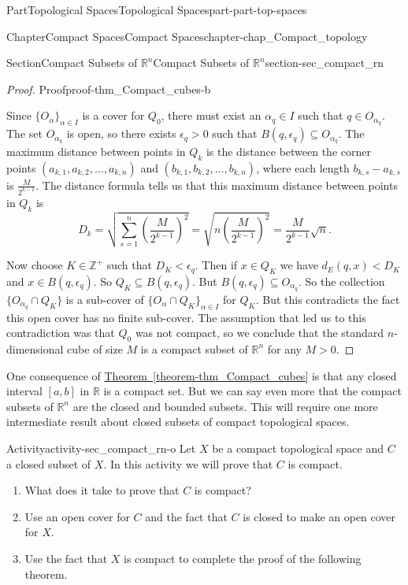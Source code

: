 \documentclass[oneside,10pt,]{book}
\newcommand{\xreffont}{\relax}
\numberwithin{equation}{chapter}
\newcommand{\Z}{\mathbb{Z}}
\newcommand{\R}{\mathbb{R}}
\newcommand{\lt}{<}
\newcommand{\gt}{>}
\begin{document}
\begin{partptx}{Part}{Topological Spaces}{}{Topological Spaces}{}{}{part-part-top-spaces}
\begin{chapterptx}{Chapter}{Compact Spaces}{}{Compact Spaces}{}{}{chapter-chap_Compact_topology}
\begin{sectionptx}{Section}{Compact Subsets of \(\R^n\)}{}{Compact Subsets of \(\R^n\)}{}{}{section-sec_compact_rn}
\begin{proof}{Proof}{}{proof-thm_Compact_cubes-b}
\par
Since \(\{O_{\alpha}\}_{\alpha \in I}\) is a cover for \(Q_0\), there must exist an \(\alpha_q \in I\) such that \(q \in O_{\alpha_q}\). The set \(O_{\alpha_q}\) is open, so there exists \(\epsilon_q \gt 0\) such that \(B(q, \epsilon_q) \subseteq O_{\alpha_q}\). The maximum distance between points in \(Q_k\) is the distance between the corner points \((a_{k,1}, a_{k,2}, \ldots,
a_{k,n})\) and \((b_{k,1}, b_{k,2}, \ldots, b_{k,n})\), where each length \(b_{k,s} - a_{k,s}\) is \(\frac{M}{2^{k-1}}\). The distance formula tells us that this maximum distance between points in \(Q_k\) is%
\begin{equation*}
D_k = \sqrt{ \sum_{s=1}^n \left(\frac{M}{2^{k-1}}\right)^2} =  \sqrt{ n \left(\frac{M}{2^{k-1}}\right)^2} = \frac{M}{2^{k-1}} \sqrt{n}\text{.}
\end{equation*}
%
\par
Now choose \(K \in \Z^+\) such that \(D_K \lt \epsilon_q\). Then if \(x \in Q_K\) we have \(d_E(q,x)\lt D_K\) and \(x \in B(q, \epsilon_q)\). So \(Q_K \subseteq B(q, \epsilon_q)\). But \(B(q, \epsilon_q) \subseteq O_{\alpha_q}\). So the collection \(\{O_{\alpha_q} \cap Q_K\}\) is a sub-cover of \(\{O_{\alpha} \cap Q_K\}_{\alpha \in I}\) for \(Q_K\). But this contradicts the fact this open cover has no finite sub-cover. The assumption that led us to this contradiction was that \(Q_0\) was not compact, so we conclude that the standard \(n\)-dimensional cube of size \(M\) is a compact subset of \(\R^n\) for any \(M \gt 0\).%
\end{proof}
One consequence of \hyperref[theorem-thm_Compact_cubes]{Theorem~{\xreffont\ref{theorem-thm_Compact_cubes}}} is that any closed interval \([a,b]\) in \(\R\) is a compact set. But we can say even more \textemdash{} that the compact subsets of \(\R^n\) are the closed and bounded subsets. This will require one more intermediate result about closed subsets of compact topological spaces.%
\begin{activity}{Activity}{}{activity-sec_compact_rn-o}%
Let \(X\) be a compact topological space and \(C\) a closed subset of \(X\). In this activity we will prove that \(C\) is compact.%
\begin{enumerate}[font=\bfseries,label=(\alph*),ref=\alph*]%
\item{}What does it take to prove that \(C\) is compact?%
\item{}Use an open cover for \(C\) and the fact that \(C\) is closed to make an open cover for \(X\).%
\item{}Use the fact that \(X\) is compact to complete the proof of the following theorem.%

\end{enumerate}
\end{activity}
\end{sectionptx}
\end{chapterptx}
\end{partptx}
\end{document}
